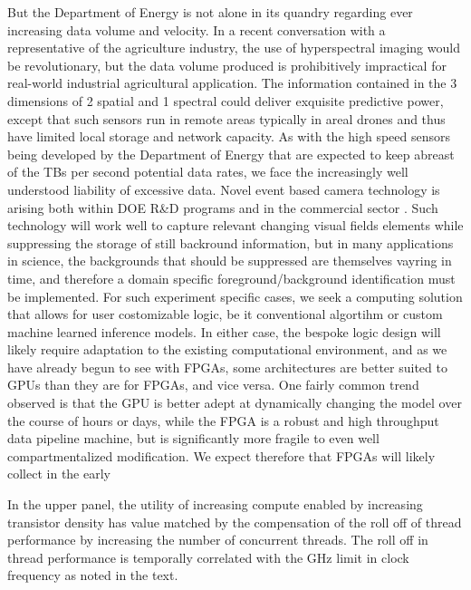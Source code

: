 \documentclass{article}
\begin{document}
But the Department of Energy is not alone in its quandry regarding ever increasing data volume and velocity.
In a recent conversation with a representative of the agriculture industry, the use of hyperspectral imaging would be revolutionary, but the data volume produced is prohibitively impractical for real-world industrial agricultural application.
The information contained in the 3 dimensions of 2 spatial and 1 spectral could deliver exquisite predictive power, except that such sensors run in remote areas typically in areal drones and thus have limited local storage and network capacity.
As with the high speed sensors being developed by the Department of Energy that are expected to keep abreast of the TBs per second potential data rates, we face the increasingly well understood liability of excessive data. 
Novel event based camera technology is arising both within DOE R\&D programs and in the commercial sector \cite{Prophesee}.  
Such technology will work well to capture relevant changing visual fields elements while suppressing the storage of still backround information, but in many applications in science, the backgrounds that should be suppressed are themselves vayring in time, and therefore a domain specific foreground/background identification must be implemented.
For such experiment specific cases, we seek a computing solution that allows for user costomizable logic, be it conventional algortihm or custom machine learned inference models.
In either case, the bespoke logic design will likely require adaptation to the existing computational environment, and as we have already begun to see with FPGAs, some architectures are better suited to GPUs than they are for FPGAs, and vice versa.
One fairly common trend observed is that the GPU is better adept at dynamically changing the model over the course of hours or days, while the FPGA is a robust and high throughput data pipeline machine, but is significantly more fragile to even well compartmentalized modification.
We expect therefore that FPGAs will likely collect in the early 


In the upper panel, the utility of increasing compute enabled by increasing transistor density has value matched by the compensation of the roll off of thread performance by increasing the number of concurrent threads.
The roll off in thread performance is temporally correlated with the GHz limit in clock frequency as noted in the text.
\end{document}
